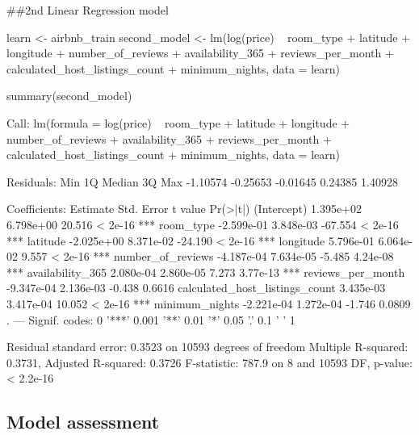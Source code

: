 \#\#2nd Linear Regression model

\begin{Schunk}
\begin{Sinput}
learn <- airbnb_train %
second_model <- lm(log(price) ~ room_type + latitude + longitude 
                        + number_of_reviews + availability_365
                       + reviews_per_month + 
                     calculated_host_listings_count + minimum_nights, data = learn)
\end{Sinput}
\end{Schunk}

\begin{Schunk}
\begin{Sinput}
summary(second_model)
\end{Sinput}
\begin{Soutput}

Call:
lm(formula = log(price) ~ room_type + latitude + longitude + 
    number_of_reviews + availability_365 + reviews_per_month + 
    calculated_host_listings_count + minimum_nights, data = learn)

Residuals:
     Min       1Q   Median       3Q      Max 
-1.10574 -0.25653 -0.01645  0.24385  1.40928 

Coefficients:
                                 Estimate Std. Error t value Pr(>|t|)    
(Intercept)                     1.395e+02  6.798e+00  20.516  < 2e-16 ***
room_type                      -2.599e-01  3.848e-03 -67.554  < 2e-16 ***
latitude                       -2.025e+00  8.371e-02 -24.190  < 2e-16 ***
longitude                       5.796e-01  6.064e-02   9.557  < 2e-16 ***
number_of_reviews              -4.187e-04  7.634e-05  -5.485 4.24e-08 ***
availability_365                2.080e-04  2.860e-05   7.273 3.77e-13 ***
reviews_per_month              -9.347e-04  2.136e-03  -0.438   0.6616    
calculated_host_listings_count  3.435e-03  3.417e-04  10.052  < 2e-16 ***
minimum_nights                 -2.221e-04  1.272e-04  -1.746   0.0809 .  
---
Signif. codes:  0 '***' 0.001 '**' 0.01 '*' 0.05 '.' 0.1 ' ' 1

Residual standard error: 0.3523 on 10593 degrees of freedom
Multiple R-squared:  0.3731,    Adjusted R-squared:  0.3726 
F-statistic: 787.9 on 8 and 10593 DF,  p-value: < 2.2e-16
\end{Soutput}
\end{Schunk}

\hypertarget{model-assessment-1}{%
\subsection{Model assessment}\label{model-assessment-1}}

